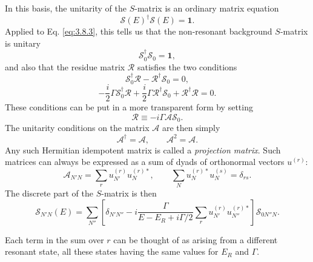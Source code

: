 In this basis, the unitarity of the $S$-matrix is an ordinary matrix equation
\begin{equation}
  \mathcal S(E)^\dagger\mathcal S(E)=\mathbf{1}.
  \tag{3.8.4}\label{eq:3.8.4}
\end{equation}
Applied to Eq. \eqref{eq:3.8.3}, this tells us that the non-resonant background
$S$-matrix is unitary
\begin{equation}
  \mathcal S_0^\dagger\mathcal S_0=\mathbf{1},
  \tag{3.8.5}\label{eq:3.8.5}
\end{equation}
and also that the residue matrix $\mathcal R$ satisfies the two conditions
\begin{equation}
  \mathcal S_0^\dagger\mathcal R-\mathcal R^\dagger\mathcal S_0=0,
  \tag{3.8.6}\label{eq:3.8.6}
\end{equation}
\begin{equation}
  -\frac{i}{2}\Gamma\mathcal S_0^\dagger\mathcal R
  +\frac{i}{2}\Gamma\mathcal R^\dagger\mathcal S_0
  +\mathcal R^\dagger\mathcal R=0.
  \tag{3.8.7}\label{eq:3.8.7}
\end{equation}
These conditions can be put in a more transparent form by setting
\begin{equation}
  \mathcal R\equiv-i\Gamma\mathcal A\mathcal S_0.
  \tag{3.8.8}\label{eq:3.8.8}
\end{equation}
The unitarity conditions on the matrix $\mathcal A$ are then simply
\begin{equation}
  \mathcal A^\dagger=\mathcal A,
  \qquad \mathcal A^2=\mathcal A.
  \tag{3.8.9}\label{eq:3.8.9}
\end{equation}
Any such Hermitian idempotent matrix is called a \emph{projection matrix}.
Such matrices can always be expressed as a sum of dyads of orthonormal vectors
$u^{(r)}$:
\begin{equation}
  \mathcal A_{N'N}=\sum_r u_{N'}^{(r)}u_N^{(r)*},
  \qquad \sum_Nu_N^{(r)*}u_N^{(s)}=\delta_{rs}.
  \tag{3.8.10}\label{eq:3.8.10}
\end{equation}
The discrete part of the $S$-matrix is then
\begin{equation}
  \mathcal S_{N'N}(E)=\sum_{N''}
  \left[\delta_{N'N''}-i\frac{\Gamma}{E-E_R+i\Gamma/2}
  \sum_r u_{N'}^{(r)}u_{N''}^{(r)*}\right]\mathcal S_{0N''N}.
  \tag{3.8.11}\label{eq:3.8.11}
\end{equation}

Each term in the sum over $r$ can be thought of as arising from a different
resonant state, all these states having the same values for $E_R$ and
$\Gamma$.


